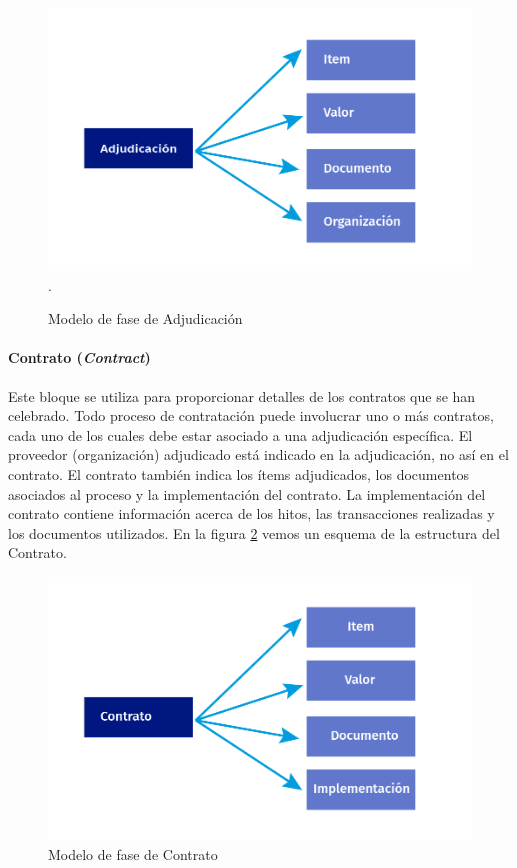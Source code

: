 \begin{figure}[htbp!]
    \centering
    \includegraphics[width=150mm]{figuras/Diagramas_Adjudicacion.png}.
    \caption{Modelo de fase de Adjudicación}
    \label{img:Fase de Adjudiacion}
\end{figure}


\paragraph{Contrato (\textit{Contract})}\hfill \break
Este bloque se utiliza para proporcionar detalles de los contratos que se han celebrado. Todo proceso de contratación puede involucrar uno o más contratos, cada uno de los cuales debe estar asociado a una adjudicación específica. El proveedor (organización) adjudicado está indicado en la adjudicación, no así en el contrato. El contrato también indica los ítems adjudicados, los documentos asociados al proceso y la implementación del contrato. La implementación del contrato contiene información acerca de los hitos, las transacciones realizadas y los documentos utilizados. En la figura \ref{img:Fase de Contrato} vemos un esquema de la estructura del Contrato.

\begin{figure}[htbp!]
    \centering
    \includegraphics[width=150mm]{figuras/Diagramas_Contrato.png}
    \caption{Modelo de fase de Contrato}
    \label{img:Fase de Contrato}
\end{figure}

